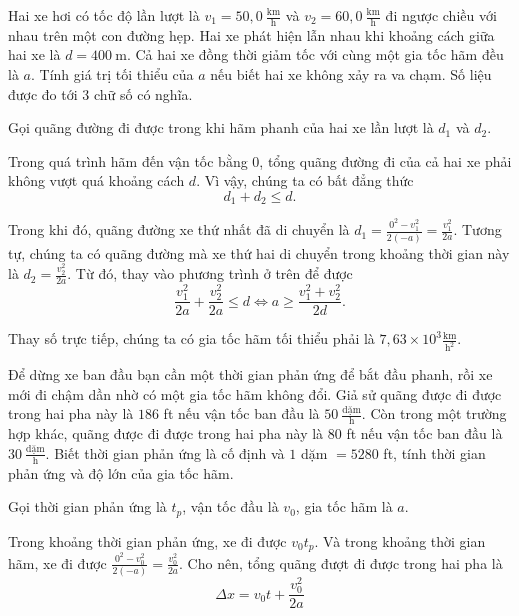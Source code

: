 \documentclass[a4paper, titlepage, openany]{book}
\newcounter{exercise}
\newcounter{solution}
\numberwithin{equation}{chapter}
\begin{document}
\exercise Hai xe hơi có tốc độ lần lượt là $v_1 = 50{,}0\ \frac{\text{km}}{\text{h}}$ và $v_2 = 60{,}0\ \frac{\text{km}}{\text{h}}$ đi ngược chiều với nhau trên một con đường hẹp. Hai xe phát hiện lẫn nhau khi khoảng cách giữa hai xe là $d = 400\ \text{m}$. Cả hai xe đồng thời giảm tốc với cùng một gia tốc hãm đều là $a$. Tính giá trị tối thiểu của $a$ nếu biết hai xe không xảy ra va chạm. Số liệu được đo tới $3$ chữ số có nghĩa.

\solution

Gọi quãng đường đi được trong khi hãm phanh của hai xe lần lượt là $d_1$ và $d_2$.

Trong quá trình hãm đến vận tốc bằng $0$, tổng quãng đường đi của cả hai xe phải không vượt quá khoảng cách $d$. Vì vậy, chúng ta có bất đẳng thức $$d_1 + d_2 \leq d.$$

Trong khi đó, quãng đường xe thứ nhất đã di chuyển là $d_1 = \frac{0^2 - v_1^2}{2(-a)} = \frac{v_1^2}{2a}$. Tương tự, chúng ta có quãng đường mà xe thứ hai di chuyển trong khoảng thời gian này là $d_2 = \frac{v_2^2}{2a}$. Từ đó, thay vào phương trình ở trên để được $$
   \frac{v_1^2}{2a} + \frac{v_2^2}{2a} \le d
   \iff a \geq \frac{v_1^2+v_2^2}{2d}.
$$

Thay số trực tiếp, chúng ta có gia tốc hãm tối thiểu phải là $\boxed{7{,}63 \times 10^3 \frac{\text{km}}{\text{h}^2}}$.

\exercise Để dừng xe ban đầu bạn cần một thời gian phản ứng để bắt đầu phanh, rồi xe mới đi chậm dần nhờ có một gia tốc hãm không đổi. Giả sử quãng được đi được trong hai pha này là $186$ ft nếu vận tốc ban đầu là $50\ \frac{\text{dặm}}{\text{h}}$. Còn trong một trường hợp khác, quãng được đi được trong hai pha này là $80$ ft nếu vận tốc ban đầu là $30\ \frac{\text{dặm}}{\text{h}}$. Biết thời gian phản ứng là cố định và $1$ dặm $= 5280$ ft, tính thời gian phản ứng và độ lớn của gia tốc hãm.

\solution

Gọi thời gian phản ứng là $t_p$, vận tốc đầu là $v_0$, gia tốc hãm là $a$.

Trong khoảng thời gian phản ứng, xe đi được $v_0t_p$. Và trong khoảng thời gian hãm, xe đi được $\frac{0^2-v_0^2}{2(-a)}=\frac{v_0^2}{2a}$. Cho nên, tổng quãng đượt đi được trong hai pha là 
\begin{equation}
\Delta x = v_0 t + \frac{v_0^2}{2a}
\label{eq:stopping_distance}
\end{equation}
\end{document}
